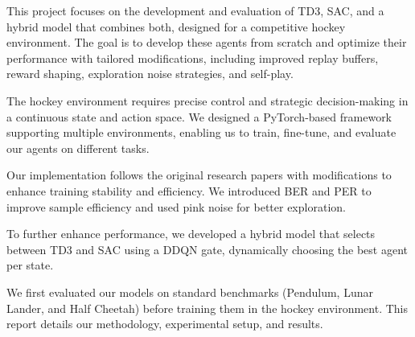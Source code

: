This project focuses on the development and evaluation of \ac{TD3}, \ac{SAC}, and a hybrid model that combines both, designed for a competitive hockey environment. The goal is to develop these agents from scratch and optimize their performance with tailored modifications, including improved replay buffers, reward shaping, exploration noise strategies, and self-play.

The hockey environment requires precise control and strategic decision-making in a continuous state and action space. We designed a PyTorch-based framework supporting multiple environments, enabling us to train, fine-tune, and evaluate our agents on different tasks.

Our implementation follows the original research papers with modifications to enhance training stability and efficiency. We introduced \ac{BER} and \ac{PER} to improve sample efficiency and used pink noise for better exploration.

To further enhance performance, we developed a hybrid model that selects between \ac{TD3} and \ac{SAC} using a \ac{DDQN} gate, dynamically choosing the best agent per state.

We first evaluated our models on standard benchmarks (Pendulum, Lunar Lander, and Half Cheetah) before training them in the hockey environment. This report details our methodology, experimental setup, and results.
